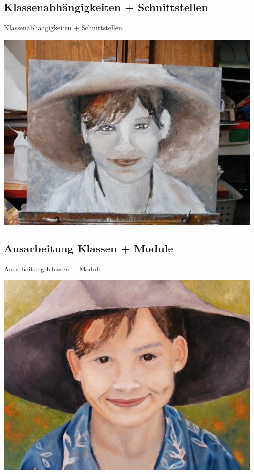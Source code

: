 \documentclass[19pt]{beamer}
\begin{document}
\subsection{Klassenabhängigkeiten + Schnittstellen}
\begin{frame}{Klassenabhängigkeiten + Schnittstellen}
\begin{center}
\includegraphics[scale=0.3]{resources/basic_relations.jpg}
\end{center}
\end{frame}
\subsection{Ausarbeitung Klassen + Module}
\begin{frame}{Ausarbeitung Klassen + Module}
\begin{center}
\includegraphics[scale=0.3]{resources/outline.jpg}
\end{center}
\end{frame}
\end{document}
